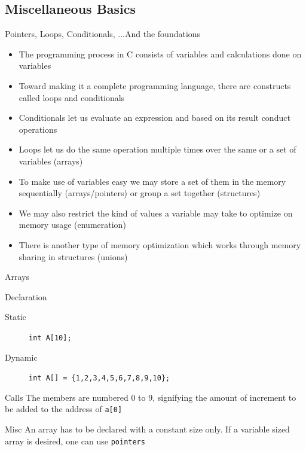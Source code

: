 \documentclass{beamer}
\begin{document}
\subsection{Miscellaneous Basics}
\begin{frame}{Pointers, Loops, Conditionals, ...}{And the foundations}
\begin{itemize}
\item The programming process in C consists of variables and calculations done on variables
\item Toward making it a complete programming language, there are constructs called loops and conditionals
\item Conditionals let us evaluate an expression and based on its result conduct operations
\item Loops let us do the same operation multiple times over the same or a set of variables (arrays)
\item To make use of variables easy we may store a set of them in the memory sequentially (arrays/pointers) or group a set together (structures)
\item We may also restrict the kind of values a variable may take to optimize on memory usage (enumeration)
\item There is another type of memory optimization which works through memory sharing in structures (unions)
\end{itemize}
\end{frame}

\begin{frame}[fragile]{Arrays}
\begin{block}{Declaration}
\begin{description}
\item[Static] \verb|int A[10];|
\item[Dynamic] \verb|int A[] = {1,2,3,4,5,6,7,8,9,10};|
\end{description}
\end{block}
\begin{block}{Calls}
The members are numbered 0 to 9, signifying the amount of increment to be added to the address of \verb|a[0]|
\end{block}
\begin{block}{Misc}
An array has to be declared with a constant size only. If a variable sized array is desired, one can use \verb|pointers|
\end{block}
\end{frame}
\end{document}
